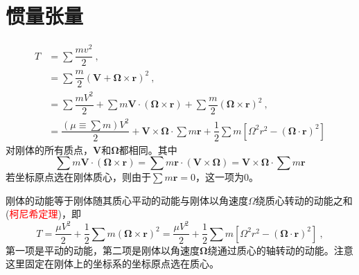 \documentclass[11pt,a4paper]{article}
\renewcommand{\vec}[1]{\boldsymbol{#1}}
\begin{document}
\section{惯量张量}
\begin{align}
\nonumber T &= \sum \dfrac{mv^2}{2} ~, \\
\nonumber &= \sum \dfrac{m}{2} (\vec{V} +\vec{\Omega} \times \vec{r})^2 ~, \\
\nonumber &= \sum \dfrac{m V^2}{2} +\sum m\vec{V}\cdot (\vec{\Omega} \times \vec{r}) +\sum \dfrac{m}{2}  (\vec{\Omega} \times \vec{r})^2 ~, \\
\nonumber &= \dfrac{(\mu \equiv \sum m) V^2}{2} + \vec{V} \times \vec{\Omega} \cdot \sum m \vec{r} +\dfrac{1}{2} \sum m \left[\Omega^2 r^2 -(\vec{\Omega} \cdot \vec{r})^2 \right]
\end{align}
对刚体的所有质点，$\vec{V}$和$\vec{\Omega}$都相同。其中
\begin{equation}
\sum m\vec{V}\cdot (\vec{\Omega} \times \vec{r}) = \sum m \vec{r}\cdot (\vec{V} \times \vec{\Omega}) = \vec{V} \times \vec{\Omega} \cdot \sum m \vec{r}
\end{equation}
若坐标原点选在刚体质心，则由于$\sum m \vec{r} = 0$，这一项为$0$。

刚体的动能等于刚体随其质心平动的动能与刚体以角速度$\Omega$绕质心转动的动能之和(\textcolor{red}{柯尼希定理})，即
\begin{equation}
T = \dfrac{ \mu V^2}{2} +\dfrac{1}{2} \sum m(\vec{\Omega} \times \vec{r})^2 = \dfrac{ \mu V^2}{2} +\dfrac{1}{2} \sum m \left[\Omega^2 r^2 -(\vec{\Omega} \cdot \vec{r})^2 \right] ~,
\end{equation}
第一项是平动的动能，第二项是刚体以角速度$\vec{\Omega}$绕通过质心的轴转动的动能。注意这里固定在刚体上的坐标系的坐标原点选在质心。
\end{document}
